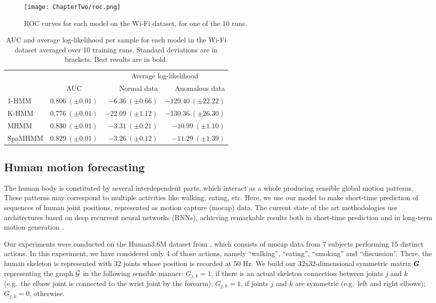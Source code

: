\begin{figure}
	\centering
	\texttt{[image: ChapterTwo/roc.png]}
	\caption{ROC curves for each model on the Wi-Fi dataset, for one of the 10 runs.}
	\label{fig:roc}
\end{figure}

\begin{table}
	\centering
	\begin{tabular}{l|r|r r}
		\multicolumn{1}{c}{} & \multicolumn{1}{c}{} & \multicolumn{2}{c}{Average log-likelihood} \\
		& \multicolumn{1}{c|}{AUC} & Normal data & Anomalous data \\
		\hline
		1-HMM & $0.806~(\pm 0.01)$ & $-6.36~(\pm 0.66)$ & $-129.40~(\pm 22.22)$ \\
		K-HMM & $0.776~(\pm 0.01)$ & $-22.09~(\pm 1.12)$ & $\mathbf{-130.36}~(\pm 26.30)$ \\
		MHMM & $\mathbf{0.830}~(\pm 0.01)$ & $-3.31~(\pm 0.21)$ & $-10.99~(\pm 1.10)$ \\
		SpaMHMM & $0.829~(\pm 0.01)$ & $\mathbf{-3.26}~(\pm 0.12)$ & $-11.29~(\pm 1.39)$ \\
	\end{tabular}
	\caption{AUC and average log-likelihood per sample for each model in the Wi-Fi dataset averaged over 10 training runs. Standard deviations are in brackets. Best results are in bold.}
	\label{tbl:wifi_results}
\end{table}

\subsection{Human motion forecasting}
\label{sec:h36m}
The human body is constituted by several interdependent parts, which interact as a whole producing sensible global motion patterns. These patterns may correspond to multiple activities like walking, eating, etc. Here, we use our model to make short-time prediction of sequences of human joint positions, represented as motion capture (mocap) data. The current state of the art methodologies use architectures based on deep recurrent neural networks (RNNs), achieving remarkable results both in short-time prediction \citet{Fragkiadaki2015, Martinez2017} and in long-term motion generation \citet{Jain2016, Pavllo2018}.

Our experiments were conducted on the Human3.6M dataset from \citet{Ionescu2011, Ionescu2014}, which consists of mocap data from 7 subjects performing 15 distinct actions. In this experiment, we have considered only 4 of those actions, namely ``walking'', ``eating'', ``smoking'' and ``discussion''. There, the human skeleton is represented with 32 joints whose position is recorded at 50 Hz. We build our 32x32-dimensional symmetric matrix ${\bm{G}}$ representing the graph ${\mathcal{G}}$ in the following sensible manner: $G_{j,k}=1$, if there is an actual skeleton connection between joints $j$ and $k$ (e.g.\  the elbow joint is connected to the wrist joint by the forearm); $G_{j,k}=1$, if joints $j$ and $k$ are symmetric (e.g.\  left and right elbows); $G_{j,k}=0$, otherwise.

